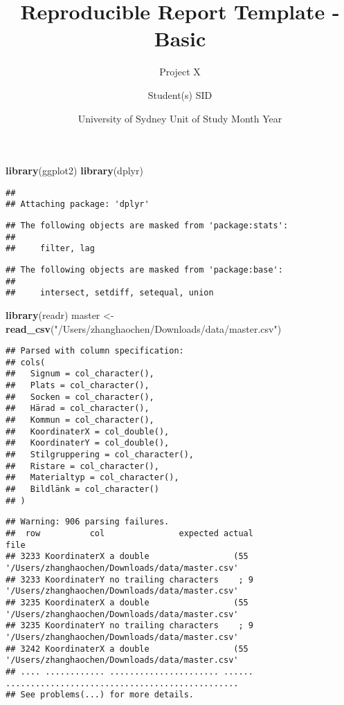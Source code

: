 \documentclass[]{article}
\title{Reproducible Report Template - Basic}
\subtitle{Project X}
\author{Student(s) SID}
\date{University of Sydney \textbar{} Unit of Study \textbar{} Month Year}
\newenvironment{Shaded}{\begin{snugshade}}{\end{snugshade}}
\newcommand{\KeywordTok}[1]{\textcolor[rgb]{0.13,0.29,0.53}{\textbf{#1}}}
\newcommand{\NormalTok}[1]{#1}
\newcommand{\StringTok}[1]{\textcolor[rgb]{0.31,0.60,0.02}{#1}}
\begin{document}
\maketitle

{
\setcounter{tocdepth}{3}
\tableofcontents
}
\begin{Shaded}
\begin{Highlighting}[]
\KeywordTok{library}\NormalTok{(ggplot2)}
\KeywordTok{library}\NormalTok{(dplyr)}
\end{Highlighting}
\end{Shaded}

\begin{verbatim}
## 
## Attaching package: 'dplyr'
\end{verbatim}

\begin{verbatim}
## The following objects are masked from 'package:stats':
## 
##     filter, lag
\end{verbatim}

\begin{verbatim}
## The following objects are masked from 'package:base':
## 
##     intersect, setdiff, setequal, union
\end{verbatim}

\begin{Shaded}
\begin{Highlighting}[]
\KeywordTok{library}\NormalTok{(readr)}
\NormalTok{master <-}\StringTok{ }\KeywordTok{read_csv}\NormalTok{(}\StringTok{"/Users/zhanghaochen/Downloads/data/master.csv"}\NormalTok{)}
\end{Highlighting}
\end{Shaded}

\begin{verbatim}
## Parsed with column specification:
## cols(
##   Signum = col_character(),
##   Plats = col_character(),
##   Socken = col_character(),
##   Härad = col_character(),
##   Kommun = col_character(),
##   KoordinaterX = col_double(),
##   KoordinaterY = col_double(),
##   Stilgruppering = col_character(),
##   Ristare = col_character(),
##   Materialtyp = col_character(),
##   Bildlänk = col_character()
## )
\end{verbatim}

\begin{verbatim}
## Warning: 906 parsing failures.
##  row          col               expected actual                                            file
## 3233 KoordinaterX a double                 (55  '/Users/zhanghaochen/Downloads/data/master.csv'
## 3233 KoordinaterY no trailing characters    ; 9 '/Users/zhanghaochen/Downloads/data/master.csv'
## 3235 KoordinaterX a double                 (55  '/Users/zhanghaochen/Downloads/data/master.csv'
## 3235 KoordinaterY no trailing characters    ; 9 '/Users/zhanghaochen/Downloads/data/master.csv'
## 3242 KoordinaterX a double                 (55  '/Users/zhanghaochen/Downloads/data/master.csv'
## .... ............ ...................... ...... ...............................................
## See problems(...) for more details.
\end{verbatim}
\end{document}
